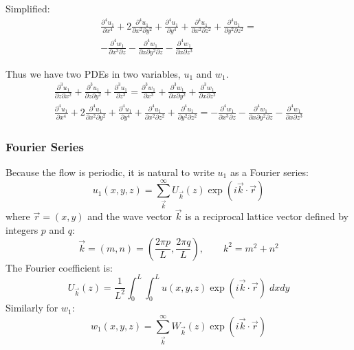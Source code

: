 \documentclass[12pt, a4paper, twoside, openright]{book}
\begin{document}
Simplified:
\begin{multline}
\frac{\partial^4 u_1}{\partial x^4} 
+ 2 \frac{\partial^4 u_1}{\partial x^2 \partial y^2} 
+ \frac{\partial^4 u_1}{\partial y^4}
+ \frac{\partial^4 u_1}{\partial x^2 \partial z^2} 
+ \frac{\partial^4 u_1}{\partial y^2 \partial z^2}
=  \\
- \frac{\partial^4 w_1}{\partial x^3 \partial z} 
- \frac{\partial^4 w_1}{\partial x \partial y^2 \partial z} 
- \frac{\partial^4 w_1}{\partial x \partial z^3} 
\end{multline}

Thus we have two PDEs in two variables, $u_1$ and $w_1$.
\begin{gather}
\frac{\partial^3 u_1}{\partial z \partial x^2} + \frac{\partial^3 u_1}{\partial z \partial y^2}
+ \frac{\partial^3 u_1}{\partial z^3} =
\frac{\partial^3 w_1}{\partial x^3} + \frac{\partial^3 w_1}{\partial x \partial y^2}
+ \frac{\partial^3 w_1}{\partial x \partial z^2} 
\\
\frac{\partial^4 u_1}{\partial x^4} 
+ 2 \frac{\partial^4 u_1}{\partial x^2 \partial y^2} 
+ \frac{\partial^4 u_1}{\partial y^4}
+ \frac{\partial^4 u_1}{\partial x^2 \partial z^2} 
+ \frac{\partial^4 u_1}{\partial y^2 \partial z^2}
=
- \frac{\partial^4 w_1}{\partial x^3 \partial z} 
- \frac{\partial^4 w_1}{\partial x \partial y^2 \partial z} 
- \frac{\partial^4 w_1}{\partial x \partial z^3} 
\end{gather}


\subsubsection*{Fourier Series}

Because the flow is periodic, it is natural to write $u_1$ as a Fourier series:
\begin{equation}
u_1(x,y,z) = \sum_{\vec{k}}^{\infty} U_{\vec{k}}(z) \exp(i \vec{k}\cdot \vec{r})
\end{equation}
where $\vec{r} = (x,y)$ and the wave vector $\vec{k}$ is a reciprocal lattice vector defined by integers $p$ and $q$:
\begin{equation}
\vec{k} = (m,n) = (\frac{ 2\pi p }{L}, \frac{ 2\pi q }{L}), \qquad k^2 = m^2 + n^2
\end{equation}
The Fourier coefficient is:
\begin{equation}
U_{\vec{k}}(z) = \frac{1}{L^2} \int_0^L \int_0^L u(x,y,z) \exp(i \vec{k} \cdot \vec{r})
\;dxdy
\end{equation}
Similarly for $w_1$:
\begin{equation}
w_1(x,y,z) = \sum_{\vec{k}}^{\infty} W_{\vec{k}}(z) \exp(i \vec{k}\cdot \vec{r})
\end{equation}
\end{document}
